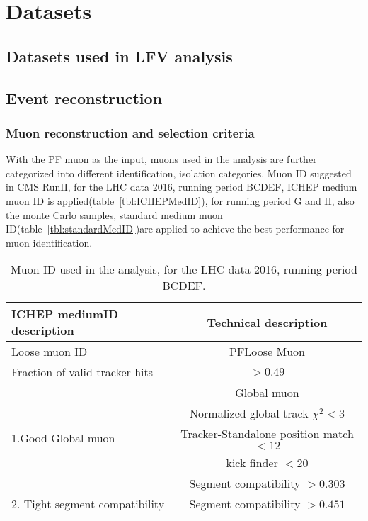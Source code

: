 
\chapter{Datasets}
\section{Datasets used in LFV analysis}




\section{Event reconstruction}


\subsection{Muon reconstruction and selection criteria}

With the PF muon as the input, muons used in the analysis are further categorized into different identification, isolation categories. Muon ID suggested in CMS RunII, for the LHC data 2016, running period BCDEF, ICHEP medium muon ID is applied(table~\ref{tbl:ICHEPMedID}), for running period G and H, also the monte Carlo samples, standard medium muon ID(table~\ref{tbl:standardMedID})are applied to achieve the best performance for muon identification.


\begin{table}[!tpb]
\caption{Muon ID used in the analysis, for the LHC data 2016, running period BCDEF.  \label{tbl:ICHEPMedID}}
\label{tab:antil}
\begin{center}
\begin{tabular}{|l|c|}   
\hline
ICHEP mediumID description                    &  Technical description\\\hline
Loose muon ID                               & PFLoose Muon\\\hline
Fraction of valid tracker hits           & $>0.49$ \\\hline
\multirow{5}{*}{1.Good Global muon}                      &Global muon\\\cline{2-2}
                                                                        &Normalized global-track $\chi^{2}<3$\\\cline{2-2}
                                                                        &Tracker-Standalone position match $< 12$\\\cline{2-2}
                                                                        &kick finder $< 20$ \\\cline{2-2}
                                                                        &Segment compatibility $> 0.303$ \\\hline                                                                       
\hline
2. Tight segment compatibility      & Segment compatibility $>0.451$\\\hline
\end{tabular}
\end{center}
\end{table}


